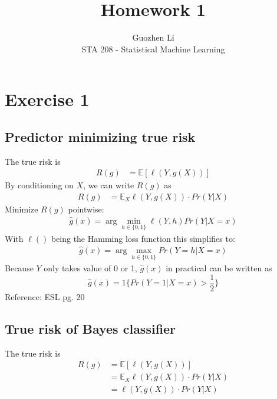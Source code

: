 \documentclass[12pt]{article}
\begin{document}
 
 
 
\title{Homework 1}%
\author{Guozhen Li\\ %
STA 208 - Statistical Machine Learning} %
 
\maketitle


\section{Exercise 1}
\subsection{Predictor minimizing true risk}
The true risk is
\begin{align*}
	R(g) & = \mathbb{E}[\ell(Y,g(X))]
\end{align*}
By conditioning on $X$, we can write $R(g)$ as
\begin{align*}
	R(g) & = \mathbb{E}_X \ell(Y, g(X)) \cdot Pr(Y|X)
\end{align*}
Minimize $R(g)$ pointwise:
\begin{align*}
	\hat{g}(x) = \arg\min_{h\in\{0,1\}} \ell(Y, h) Pr(Y|X=x)
\end{align*}
With $\ell()$ being the Hamming loss function this simplifies to:
\begin{align*}
	\hat{g}(x) = \arg\max_{h\in\{0,1\}} Pr(Y=h|X=x)
\end{align*}
Because $Y$ only takes value of 0 or 1, $\hat{g}(x)$ in practical can be written as
\[\hat{g}(x)=1\{Pr(Y=1|X=x)>\frac{1}{2}\}\]
{\scriptsize Reference: ESL pg. 20}

\subsection{True risk of Bayes classifier}
The true risk is
\begin{align*}
	R(g) & = \mathbb{E}[\ell(Y,g(X))] \\
	& = \mathbb{E}_X \ell(Y, g(X)) \cdot Pr(Y|X) \\
	& = \ell(Y, g(X)) \cdot Pr(Y|X)
\end{align*}
\end{document}
